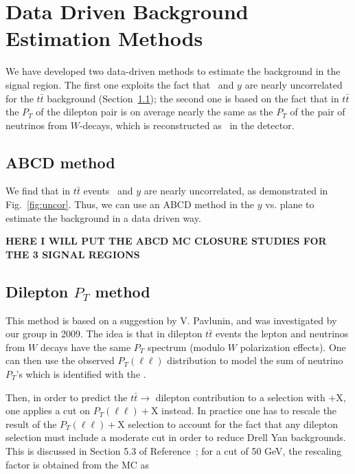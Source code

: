 \section{Data Driven Background Estimation Methods}
\label{sec:datadriven}
We have developed two data-driven methods to 
estimate the background in the signal region.
The first one exploits the fact that 
\Ht\ and $y$ are nearly 
uncorrelated for the $t\bar{t}$ background 
(Section~\ref{sec:abcd});  the second one 
is based on the fact that in $t\bar{t}$ the
$P_T$ of the dilepton pair is on average 
nearly the same as the $P_T$ of the pair of neutrinos
from $W$-decays, which is reconstructed as \met\ in the
detector.



\subsection{ABCD method}
\label{sec:abcd}

We find that in $t\bar{t}$ events \Ht\ and 
$y$ are nearly uncorrelated, 
as demonstrated in Fig.~\ref{fig:uncor}.
Thus, we can use an ABCD method in the $y$ vs. \Ht
plane to estimate the background in a data driven way.

{\color{red} \bf HERE I WILL PUT THE ABCD MC CLOSURE STUDIES FOR THE 3 SIGNAL REGIONS}


\clearpage

\subsection{Dilepton $P_T$ method}
\label{sec:victory}
This method is based on a suggestion by V. Pavlunin\cite{ref:victory},
and was investigated by our group in 2009\cite{ref:ourvictory}.
The idea is that in dilepton $t\bar{t}$ events the lepton and neutrinos
from $W$ decays have the same $P_T$ spectrum (modulo $W$ polarization 
effects).  One can then use the observed 
$P_T(\ell\ell)$ distribution to model the sum of neutrino $P_T$'s which 
is identified with the \met.

Then, in order to predict the $t\bar{t} \to$ dilepton contribution to a 
selection with \met$+$X, one applies a cut on $P_T(\ell\ell)+$X instead.
In practice one has to rescale the result of the $P_T(\ell\ell)+$X selection
to account for the fact that any dilepton selection must include a 
moderate \met cut in order to reduce Drell Yan backgrounds.  This 
is discussed in Section 5.3 of Reference~\cite{ref:ourvictory}; for a \met
cut of 50 GeV, the rescaling factor is obtained from the MC as

